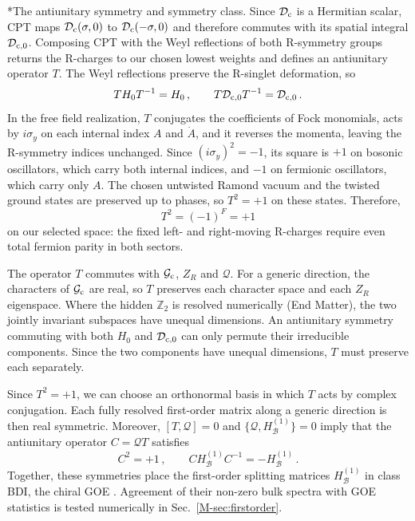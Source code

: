 \documentclass[aps,onecolumn,groupedaddress,nofootinbib,pra]{revtex4-2}
\makeatletter
\renewcommand\paragraph{\@startsection{paragraph}{4}{\parindent}{\z@}{-1em}{\normalfont\normalsize\bfseries}}
\newcommand{\Def}{\mathcal D}
\newcommand{\B}{\mathcal B}
\newcommand{\HB}{H_{\B}}
\newcommand{\cMat}{{\rm c}}
\newcommand{\Dc}{\Def_{\cMat}}
\newcommand{\Hc}{{\cal G}_{\cMat}}
\newcommand{\Dcz}{\Def_{\cMat,0}}
\makeatother
\begin{document}
\paragraph*{The antiunitary symmetry and symmetry class.}
Since $\Dc$ is a Hermitian scalar, CPT maps $\Dc(\sigma,0)$ to $\Dc(-\sigma,0)$ and therefore commutes with its spatial integral $\Dcz$. Composing CPT with the Weyl reflections of both R-symmetry groups returns the R-charges to our chosen lowest weights and defines an antiunitary operator $T$. The Weyl reflections preserve the R-singlet deformation, so
\begin{equation}
T H_0 T^{-1}=H_0\,,\qquad
T\Dcz T^{-1}=\Dcz \,.
\end{equation}
In the free field realization, $T$ conjugates the coefficients of Fock monomials, acts by $i\sigma_y$ on each internal index $A$ and $\dot A$, and it reverses the momenta, leaving the R-symmetry indices unchanged. Since $(i\sigma_y)^2=-1$, its square is $+1$ on bosonic oscillators, which carry both internal indices, and $-1$ on fermionic oscillators, which carry only $A$. The chosen untwisted Ramond vacuum and the twisted ground states are preserved up to phases, so $T^2=+1$ on these states. Therefore,
\begin{equation}
T^2=(-1)^F=+1
\end{equation}
on our selected space: the fixed left- and right-moving R-charges require even total fermion parity in both sectors.

The operator $T$ commutes with $\Hc$, $Z_R$ and $\mathcal Q$. For a generic direction, the characters of $\Hc$ are real, so $T$ preserves each character space and each $Z_R$ eigenspace. Where the hidden $\mathbb Z_2$ is resolved numerically (End Matter), the two jointly invariant subspaces have unequal dimensions. An antiunitary symmetry commuting with both $H_0$ and $\Dcz$ can only permute their irreducible components. Since the two components have unequal dimensions, $T$ must preserve each separately.

Since $T^2=+1$, we can choose an orthonormal basis in which $T$ acts by complex conjugation. Each fully resolved first-order matrix along a generic direction is then real symmetric. Moreover, $[T,\mathcal Q]=0$ and $\{\mathcal Q,\HB^{(1)}\}=0$ imply that the antiunitary operator $C=\mathcal Q T$ satisfies
\begin{equation}
\label{eq:Csquared}
C^2=+1\,,\qquad C\HB^{(1)}C^{-1}=-\HB^{(1)}\,.
\end{equation}
Together, these symmetries place the first-order splitting matrices $\HB^{(1)}$ in class BDI, the chiral GOE \cite{Verbaarschot:1994qf,Altland:1997zz}. Agreement of their non-zero bulk spectra with GOE statistics is tested numerically in Sec.~\ref{M-sec:firstorder}.
\end{document}
